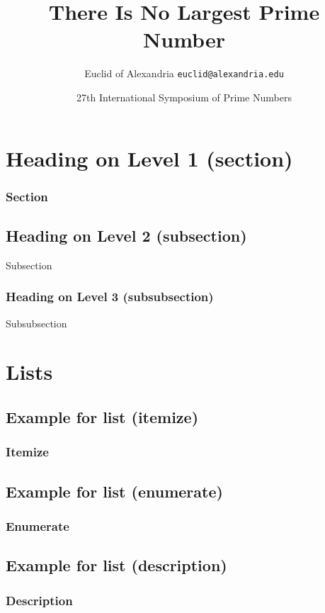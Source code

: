 \documentclass{beamer}
\title{There Is No Largest Prime Number}
\date[ISPN ’80]{27th International Symposium of Prime Numbers}
\author[Euclid]{Euclid of Alexandria \texttt{euclid@alexandria.edu}}
\begin{document}
\begin{frame}
\titlepage
\end{frame}

\begin{frame}
\tableofcontents	
\end{frame}

\section{Heading on Level 1 (section)}
\begin{frame}
\frametitle{Section}
\blindtext	
\end{frame}

\subsection{Heading on Level 2 (subsection)}
\begin{frame}{Subsection}
\blindtext	
\end{frame}

\subsubsection{Heading on Level 3 (subsubsection)}
\begin{frame}{Subsubsection}
\blindtext	
\end{frame}


\section{Lists}
\subsection{Example for list (itemize)}
\begin{frame}
\frametitle{Itemize}
\blinditemize
\end{frame}

\subsection{Example for list (enumerate)}
\begin{frame}
\frametitle{Enumerate}
\blindenumerate
\end{frame}

\subsection{Example for list (description)}
\begin{frame}
\frametitle{Description}
\blinddescription
\end{frame}
\end{document}
